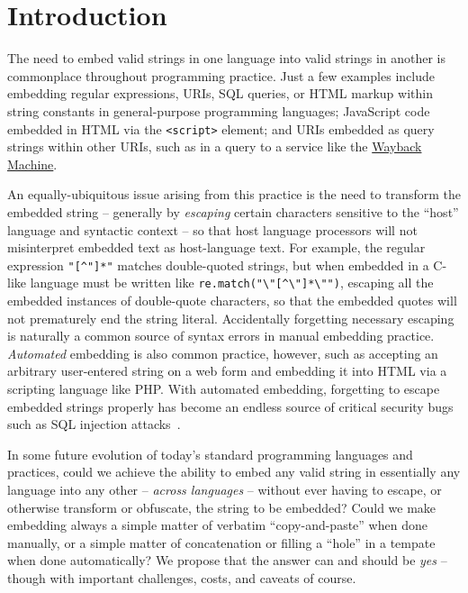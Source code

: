 \section{Introduction}
\label{sec:intro}

The need to embed valid strings in one language into valid strings in another
is commonplace throughout programming practice.
Just a few examples include embedding
regular expressions, URIs, SQL queries, or HTML markup
within string constants in general-purpose programming languages;
JavaScript code embedded in HTML via the \verb|<script>| element;
and URIs embedded as query strings within other URIs,
such as in a query to a service like the
\href{https://archive.org/web/}{Wayback Machine}.

An equally-ubiquitous issue arising from this practice
is the need to transform the embedded string --
generally by \emph{escaping} certain characters sensitive
to the ``host'' language and syntactic context --
so that host language processors will not misinterpret embedded text
as host-language text.
For example,
the regular expression \verb|"[^"]*"| matches double-quoted strings,
but when embedded in a C-like language must be written
like \verb|re.match("\"[^\"]*\"")|,
escaping all the embedded instances of double-quote characters,
so that the embedded quotes will not prematurely end the string literal.
Accidentally forgetting necessary escaping
is naturally a common source of syntax errors in manual embedding practice.
\emph{Automated} embedding is also common practice, however,
such as accepting an arbitrary user-entered string on a web form
and embedding it into HTML via a scripting language like PHP.
With automated embedding,
forgetting to escape embedded strings properly
has become an endless source of critical security bugs
such as SQL injection attacks~\cite{clarke12sql}.

In some future evolution
of today's standard programming languages and practices,
could we achieve the ability to embed any valid string
in essentially any language into any other --
\emph{across languages} --
without ever having to escape, or otherwise transform or obfuscate,
the string to be embedded?
Could we make embedding always a simple matter of verbatim ``copy-and-paste''
when done manually,
or a simple matter of concatenation
or filling a ``hole'' in a tempate
when done automatically?
We propose that the answer can and should be \emph{yes} --
though with important challenges, costs, and caveats of course.

